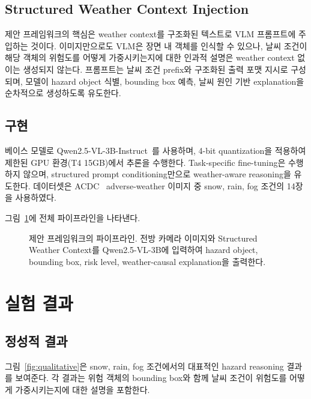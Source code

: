 \documentclass[a4paper,10pt]{article}
\begin{document}
\subsection{Structured Weather Context Injection}

제안 프레임워크의 핵심은 weather context를 구조화된 텍스트로 VLM 프롬프트에 주입하는 것이다. 이미지만으로도 VLM은 장면 내 객체를 인식할 수 있으나, 날씨 조건이 해당 객체의 위험도를 어떻게 가중시키는지에 대한 인과적 설명은 weather context 없이는 생성되지 않는다. 프롬프트는 날씨 조건 prefix와 구조화된 출력 포맷 지시로 구성되며, 모델이 hazard object 식별, bounding box 예측, 날씨 원인 기반 explanation을 순차적으로 생성하도록 유도한다.

\subsection{구현}

베이스 모델로 Qwen2.5-VL-3B-Instruct~\cite{qwen2025}를 사용하며, 4-bit quantization을 적용하여 제한된 GPU 환경(T4 15GB)에서 추론을 수행한다. Task-specific fine-tuning은 수행하지 않으며, structured prompt conditioning만으로 weather-aware reasoning을 유도한다. 데이터셋은 ACDC~\cite{acdc2021} adverse-weather 이미지 중 snow, rain, fog 조건의 14장을 사용하였다.

그림~\ref{fig:pipeline}에 전체 파이프라인을 나타낸다.

\begin{figure}[h]
  \centering
  \fbox{\rule{0pt}{2.5cm}\rule{\columnwidth}{0pt}}
  \caption{제안 프레임워크의 파이프라인. 전방 카메라 이미지와 Structured Weather Context를 Qwen2.5-VL-3B에 입력하여 hazard object, bounding box, risk level, weather-causal explanation을 출력한다.}
  \label{fig:pipeline}
\end{figure}

\section{실험 결과}

\subsection{정성적 결과}

그림~\ref{fig:qualitative}은 snow, rain, fog 조건에서의 대표적인 hazard reasoning 결과를 보여준다. 각 결과는 위험 객체의 bounding box와 함께 날씨 조건이 위험도를 어떻게 가중시키는지에 대한 설명을 포함한다.
\end{document}
